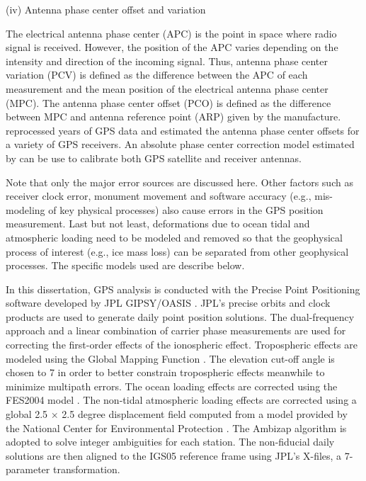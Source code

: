 (iv) Antenna phase center offset and variation 

The electrical antenna phase center (APC) is the point in space where radio signal is received.  However, the position of the APC varies depending on the intensity and direction of the incoming signal.  Thus, antenna phase center variation (PCV) is defined as the difference between the APC of each measurement and the mean position of the electrical antenna phase center (MPC).   The antenna phase center offset (PCO) is defined as the difference between MPC and antenna reference point (ARP) given by the manufacture.  \citet{steigenberger2006chpt2} reprocessed years of GPS data and estimated the antenna phase center offsets for a variety of GPS receivers.  An absolute phase center correction model estimated by \citet{schmid2007chpt2} can be use to calibrate both GPS satellite and receiver antennas.  

Note that only the major error sources are discussed here.  Other factors such as receiver clock error, monument movement and software accuracy (e.g., mis-modeling of key physical processes) also cause errors in the GPS position measurement.  Last but not least, deformations due to ocean tidal and atmospheric loading need to be modeled and removed so that the geophysical process of interest (e.g., ice mass loss) can be separated from other geophysical processes.  The specific models used are describe below.    

In this dissertation, GPS analysis is conducted with the Precise Point Positioning software developed by JPL GIPSY/OASIS \cite[]{zumberge1997chpt2}.  JPL's precise orbits and clock products are used to generate daily point position solutions.  The dual-frequency approach and a linear combination of carrier phase measurements are used for correcting the first-order effects of the ionospheric effect.  Tropospheric effects are modeled using the Global Mapping Function \cite[]{boehm2006chpt2}.  The elevation cut-off angle is chosen to 7 \textordmasculine in order to better constrain tropospheric effects meanwhile to minimize multipath errors.  The ocean loading effects are corrected using the FES2004 model \cite[]{lyard2006chpt2}.  The non-tidal atmospheric loading effects are corrected using a global 2.5 $\times$ 2.5 degree displacement field computed from a model provided by the National Center for Environmental Protection \cite[]{petrov2004chpt2}.  The Ambizap algorithm \cite[]{blewitt2008chpt2} is adopted to solve integer ambiguities for each station.  The non-fiducial daily solutions are then aligned to the IGS05 reference frame \cite[]{altamimi2007chpt2} using JPL's X-files, a 7-parameter transformation.  

